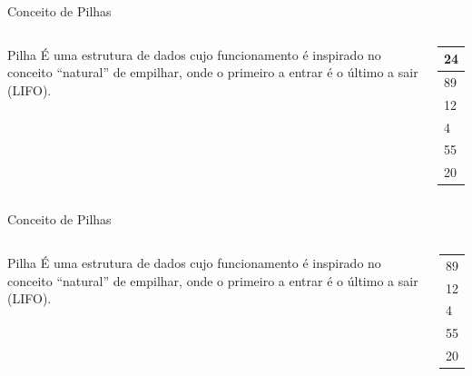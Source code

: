 \documentclass[12pt,table,xcolor={dvipsnames}]{beamer}
\begin{document}
\begin{frame}{Conceito de Pilhas}
\begin{columns}
\begin{block}{Pilha}
É uma estrutura de dados cujo funcionamento é inspirado no conceito “natural” de empilhar, onde o primeiro a entrar é o último a sair (LIFO).
\end{block}
\begin{center}
{
\begin{tabular}{ |p{.5cm}| }
\hline
24 \\ \hline
89 \\ \hline
12 \\ \hline
4 \\ \hline
55 \\ \hline
20  \\ \hline
\end{tabular}
}
\end{center}
\end{columns}
\end{frame}

\begin{frame}{Conceito de Pilhas}
	\begin{columns}
		\begin{block}{Pilha}
			É uma estrutura de dados cujo funcionamento é inspirado no conceito “natural” de empilhar, onde o primeiro a entrar é o último a sair (LIFO).
		\end{block}
		\begin{center}
			{
				\begin{tabular}{ |p{.5cm}| }
					\hline
					\\ \hline
					89 \\ \hline
					12 \\ \hline
					4 \\ \hline
					55 \\ \hline
					20  \\ \hline
				\end{tabular}
			}
		\end{center}
	\end{columns}
\end{frame}
\end{document}
